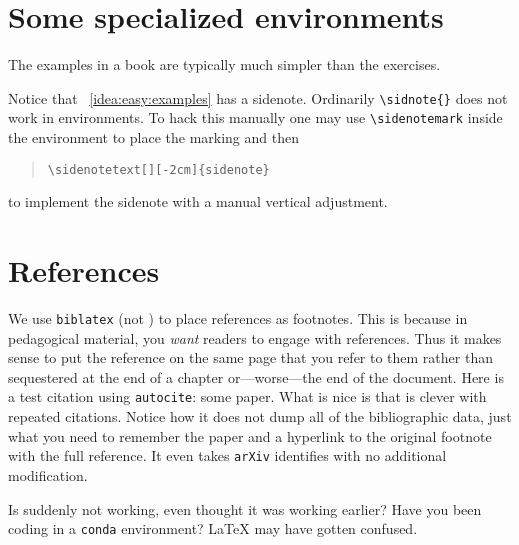 \section{Some specialized environments}

\begin{bigidea}
\label{idea:easy:examples}
The examples in a book are typically much simpler than the exercises.\sidenotemark
\end{bigidea}

\noindent  Notice that \bigidearef{}~\ref{idea:easy:examples} has a sidenote. Ordinarily \verb!\sidnote{}! does not work in environments. To hack this manually one may use \verb!\sidenotemark! inside the environment to place the marking and then 
\begin{quotation}
\verb!\sidenotetext[][-2cm]{sidenote}!
\end{quotation}
to implement the sidenote with a manual vertical adjustment.



\section{References}

We use \texttt{biblatex} (not \BibTeX{}) to place references as footnotes. This is because in pedagogical material, you \emph{want} readers to engage with references. Thus it makes sense to put the reference on the same page that you refer to them rather than sequestered at the end of a chapter or---worse---the end of the document. Here is a test citation using \texttt{autocite}: some paper.\autocite{Feng:2016ijc} What is nice is that \BibLaTeX{} is clever with repeated citations.\autocite{Feng:2016ijc} Notice how it does not dump all of the bibliographic data, just what you need to remember the paper and a hyperlink to the original footnote with the full reference. It even takes \texttt{arXiv} identifies with no additional modification.


\begin{flipcomment}
Is \BibLaTeX{} suddenly not working, even thought it was working earlier? Have you been coding in a \texttt{conda} environment? \LaTeX{} may have gotten confused.
\end{flipcomment}